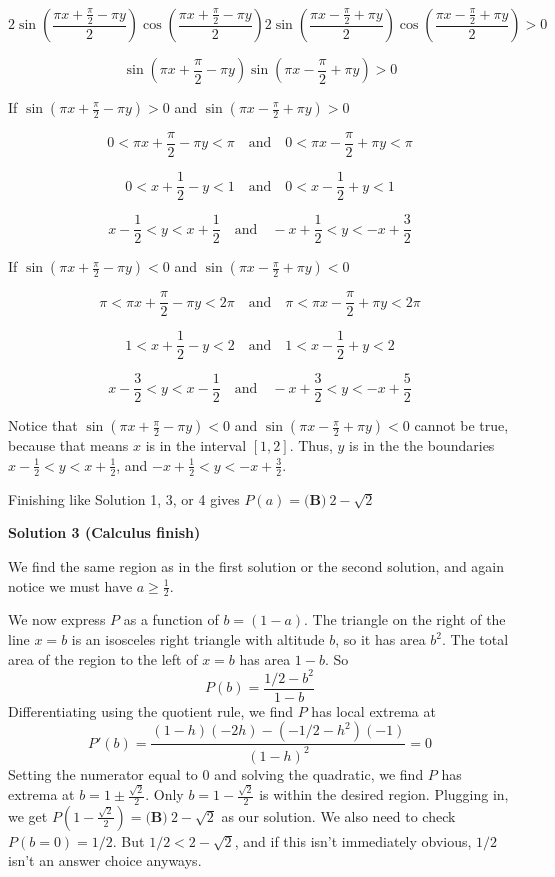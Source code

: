\begin{enumerate}
 \[2\sin{\left( \frac{ \pi x + \frac{\pi}{2} - \pi y }{2} \right)} \cos{\left( \frac{ \pi x + \frac{\pi}{2} - \pi y }{2} \right)} 2 \sin{\left( \frac{ \pi x - \frac{\pi}{2} + \pi y }{2} \right)} \cos{\left( \frac{ \pi x - \frac{\pi}{2} + \pi y }{2} \right)} > 0\]

 \[\sin{\left(\pi x + \frac{\pi}{2} - \pi y\right)} \sin{\left( \pi x - \frac{\pi}{2} + \pi y \right)} > 0\]

 If $\sin{\left(\pi x + \frac{\pi}{2} - \pi y\right)} > 0$ and $\sin{\left( \pi x - \frac{\pi}{2} + \pi y \right)} > 0$

 \[0 < \pi x + \frac{\pi}{2} - \pi y < \pi \quad \text{and} \quad 0 < \pi x - \frac{\pi}{2} + \pi y < \pi\]

 \[0 < x + \frac{1}{2} - y < 1 \quad \text{and} \quad 0 < x - \frac{1}{2} + y < 1\]

 \[x - \frac{1}{2} < y < x + \frac{1}{2} \quad \text{and} \quad -x + \frac{1}{2} < y < -x + \frac{3}{2}\]

 If $\sin{\left(\pi x + \frac{\pi}{2} - \pi y\right)} < 0$ and $\sin{\left( \pi x - \frac{\pi}{2} + \pi y \right)} < 0$

 \[\pi < \pi x + \frac{\pi}{2} - \pi y < 2\pi \quad \text{and} \quad \pi < \pi x - \frac{\pi}{2} + \pi y < 2\pi\]

 \[1 < x + \frac{1}{2} - y < 2 \quad \text{and} \quad 1 < x - \frac{1}{2} + y < 2\]

 \[x - \frac{3}{2} < y < x - \frac{1}{2} \quad \text{and} \quad -x + \frac{3}{2} < y < -x + \frac{5}{2}\]

 Notice that $\sin{\left(\pi x + \frac{\pi}{2} - \pi y\right)} < 0$ and $\sin{\left( \pi x - \frac{\pi}{2} + \pi y \right)} < 0$ cannot be true, because that means $x$ is in the interval $[1, 2]$. Thus, $y$ is in the the boundaries $x - \frac{1}{2} < y < x + \frac{1}{2}$, and $-x + \frac{1}{2} < y < -x + \frac{3}{2}$.

 Finishing like Solution 1, 3, or 4 gives $P(a) =\boxed{\textbf{(B)}\ 2 - \sqrt{2}}$




\textbf{Solution 3 (Calculus finish)}

We find the same region as in the first solution or the second solution, and again notice we must have $a \geq \frac{1}{2}$. 

 We now express $P$ as a function of $b=(1-a)$. The triangle on the right of the line $x=b$ is an isosceles right triangle with altitude $b$, so it has area $b^2$. The total area of the region to the left of $x=b$ has area $1-b$. So 
 \[P(b) = \frac{1/2 - b^2}{1-b}\]Differentiating using the quotient rule, we find $P$ has local extrema at
 \[P'(b) = \frac{(1-h)(-2h)-(-1/2 - h^2)(-1)}{(1-h)^2} = 0\]Setting the numerator equal to $0$ and solving the quadratic, we find $P$ has extrema at $b = 1 \pm \frac{\sqrt{2}}{2}$. Only $b=1-\frac{\sqrt 2}{2}$ is within the desired region. Plugging in, we get $P(1-\frac{\sqrt 2}{2}) = \boxed{\textbf{(B)}\ 2 - \sqrt{2}}$ as our solution. We also need to check $P(b=0) = 1/2$. But $1/2 < 2 - \sqrt{2}$, and if this isn't immediately obvious, $1/2$ isn't an answer choice anyways. 


\end{enumerate}
